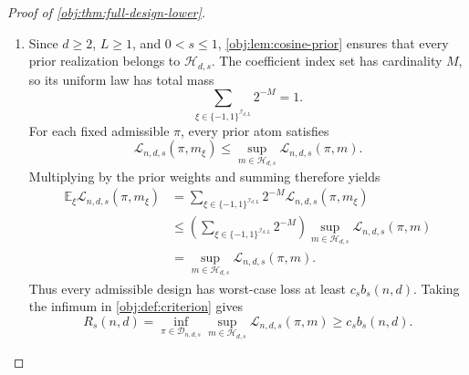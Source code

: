 \begin{proof}[Proof of \cref{obj:thm:full-design-lower}]
\begin{enumerate}
\item
Since \(d\geq2\), \(L\geq1\), and \(0<s\leq1\),
\cref{obj:lem:cosine-prior} ensures that every prior realization belongs to
\(\mathcal H_{d,s}\). The coefficient index set has cardinality \(M\), so its uniform law has total mass
\[
\sum_{\xi\in\{-1,1\}^{\mathcal I_{d,L}}}2^{-M}=1.
\]
For each fixed admissible \(\pi\), every prior atom satisfies
\[
\mathcal L_{n,d,s}(\pi,m_\xi)
\leq
\sup_{m\in\mathcal H_{d,s}}\mathcal L_{n,d,s}(\pi,m).
\]
Multiplying by the prior weights and summing therefore yields
\[
\begin{aligned}
\mathbb E_\xi\mathcal L_{n,d,s}(\pi,m_\xi)
&=\sum_{\xi\in\{-1,1\}^{\mathcal I_{d,L}}}
 2^{-M}\mathcal L_{n,d,s}(\pi,m_\xi)\\
&\leq
\left(\sum_{\xi\in\{-1,1\}^{\mathcal I_{d,L}}}2^{-M}\right)
\sup_{m\in\mathcal H_{d,s}}\mathcal L_{n,d,s}(\pi,m)\\
&=\sup_{m\in\mathcal H_{d,s}}\mathcal L_{n,d,s}(\pi,m).
\end{aligned}
\]
Thus every admissible design has worst-case loss at least \(c_sb_s(n,d)\). Taking the infimum in \cref{obj:def:criterion} gives
\[
R_s(n,d)
=\inf_{\pi\in\mathcal D_{n,d,s}}
 \sup_{m\in\mathcal H_{d,s}}\mathcal L_{n,d,s}(\pi,m)
\geq c_sb_s(n,d).
\]
\end{enumerate}
\end{proof}

